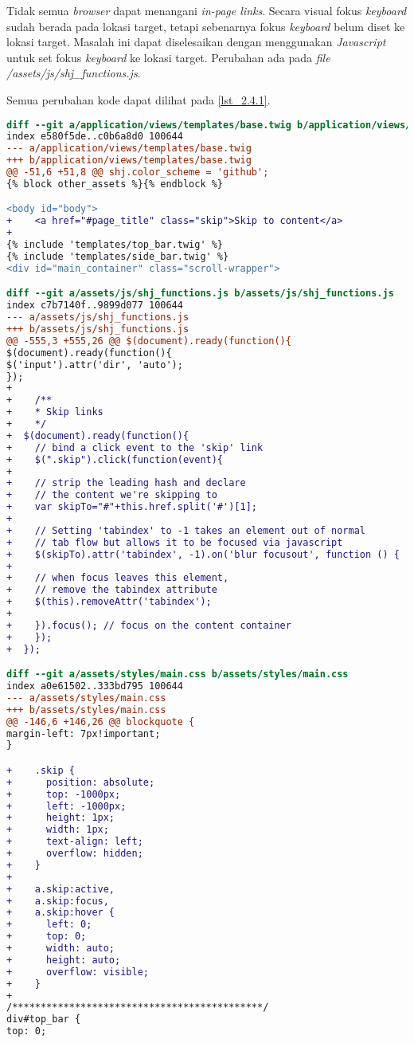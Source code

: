 Tidak semua \textit{browser} dapat menangani \textit{in-page links}. Secara visual fokus \textit{keyboard} sudah berada pada lokasi target, tetapi sebenarnya fokus \textit{keyboard} belum diset ke lokasi target. Masalah ini dapat diselesaikan dengan menggunakan \textit{Javascript} untuk set fokus \textit{keyboard} ke lokasi target. Perubahan ada pada \textit{file} \textit{/assets/js/shj\_functions.js}.

Semua perubahan kode dapat dilihat pada \ref{lst_2.4.1}.

\begin{lstlisting}[language=diff, caption=Perubahan untuk mematuhi kriteria 2.4.1, label=lst_2.4.1, basicstyle=\ttfamily, frame=single,
columns=fullflexible, keepspaces=true, breaklines=true]
diff --git a/application/views/templates/base.twig b/application/views/templates/base.twig
index e580f5de..c0b6a8d0 100644
--- a/application/views/templates/base.twig
+++ b/application/views/templates/base.twig
@@ -51,6 +51,8 @@ shj.color_scheme = 'github';
{% block other_assets %}{% endblock %}

<body id="body">
+    <a href="#page_title" class="skip">Skip to content</a>
+    
{% include 'templates/top_bar.twig' %}
{% include 'templates/side_bar.twig' %}
<div id="main_container" class="scroll-wrapper">

diff --git a/assets/js/shj_functions.js b/assets/js/shj_functions.js
index c7b7140f..9899d077 100644
--- a/assets/js/shj_functions.js
+++ b/assets/js/shj_functions.js
@@ -555,3 +555,26 @@ $(document).ready(function(){
$(document).ready(function(){
$('input').attr('dir', 'auto');
});
+    
+    /**
+    * Skip links
+    */
+  $(document).ready(function(){
+    // bind a click event to the 'skip' link
+    $(".skip").click(function(event){
+    
+    // strip the leading hash and declare
+    // the content we're skipping to
+    var skipTo="#"+this.href.split('#')[1];
+  
+    // Setting 'tabindex' to -1 takes an element out of normal 
+    // tab flow but allows it to be focused via javascript
+    $(skipTo).attr('tabindex', -1).on('blur focusout', function () {
+  
+    // when focus leaves this element, 
+    // remove the tabindex attribute
+    $(this).removeAttr('tabindex');
+  
+    }).focus(); // focus on the content container
+    });
+  });

diff --git a/assets/styles/main.css b/assets/styles/main.css
index a0e61502..333bd795 100644
--- a/assets/styles/main.css
+++ b/assets/styles/main.css
@@ -146,6 +146,26 @@ blockquote {
margin-left: 7px!important;
}

+    .skip {
+      position: absolute;
+      top: -1000px;
+      left: -1000px;
+      height: 1px;
+      width: 1px;
+      text-align: left;
+      overflow: hidden;
+    }
+  
+    a.skip:active, 
+    a.skip:focus, 
+    a.skip:hover {
+      left: 0; 
+      top: 0;
+      width: auto; 
+      height: auto; 
+      overflow: visible; 
+    }
+ 
/********************************************/
div#top_bar {
top: 0;
\end{lstlisting}

